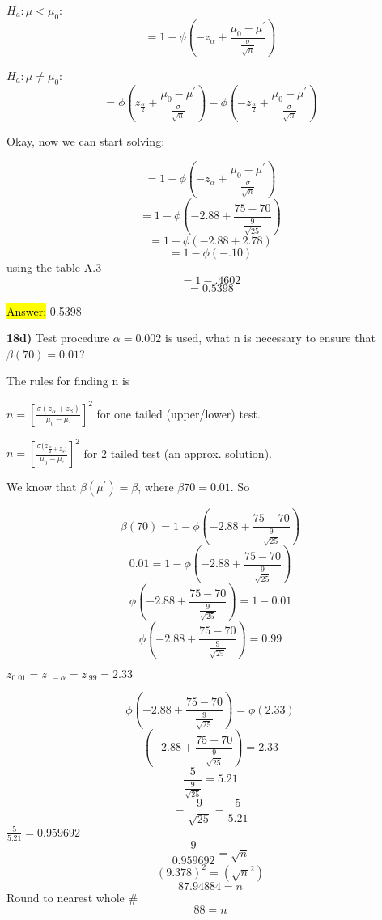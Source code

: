 \documentclass{article}
\begin{document}
$H_{a}: \mu < \mu_{0}$:
\vspace{2mm}
$$=1-\phi(-z_{\alpha}+\frac{\mu_{0}-\mu^{'}}{\frac{\sigma}{\sqrt{n}}})$$

$H_{a}: \mu \ne \mu_{0}$:
\vspace{2mm}
$$=\phi(z_{\frac{\alpha}{2}}+\frac{\mu_{0}-\mu^{'}}{\frac{\sigma}{\sqrt{n}}})-\phi(-z_{\frac{\alpha}{2}}+\frac{\mu_{0}-\mu^{'}}{\frac{\sigma}{\sqrt{n}}})$$

Okay, now we can start solving:

$$=1-\phi(-z_{\alpha}+\frac{\mu_{0}-\mu^{'}}{\frac{\sigma}{\sqrt{n}}})$$
$$=1-\phi(-2.88+\frac{75-70}{\frac{9}{\sqrt{25}}})$$
$$=1-\phi(-2.88+2.78)$$
$$=1-\phi(-.10)$$
using the table A.3
$$=1-.4602$$
$$=0.5398$$

\vspace{2mm}

\hl{Answer:} 0.5398

\vspace{5mm}
\textbf{18d)} Test procedure $\alpha=0.002$ is used, what n is necessary to ensure that $\beta(70)=0.01$?

\vspace{2mm}

The rules for finding n is 

\vspace{2mm}

$n=[\frac{\sigma(z_{\alpha}+z_{\beta})}{\mu_{0}-\mu_{'}}]^{2}$ for one tailed (upper/lower) test.

\vspace{2mm}

$n=[\frac{\sigma(z_{\frac{\alpha}{2}+z_{\beta})}}{\mu_{0}-\mu_{'}}]^{2}$ for 2 tailed test (an approx. solution).

\vspace{2mm}

We know that $\beta(\mu^{'})=\beta$, where $\beta{70}=0.01$. So

\vspace{2mm}

$$\beta(70)=1-\phi(-2.88+\frac{75-70}{\frac{9}{\sqrt{25}}})$$
$$0.01=1-\phi(-2.88+\frac{75-70}{\frac{9}{\sqrt{25}}})$$
$$\phi(-2.88+\frac{75-70}{\frac{9}{\sqrt{25}}})=1-0.01$$
$$\phi(-2.88+\frac{75-70}{\frac{9}{\sqrt{25}}})=0.99$$

$z_{0.01}=z_{1-\alpha}=z_{.99}=2.33$

$$\phi(-2.88+\frac{75-70}{\frac{9}{\sqrt{25}}})=\phi(2.33)$$
$$(-2.88+\frac{75-70}{\frac{9}{\sqrt{25}}})=2.33$$
$$\frac{5}{\frac{9}{\sqrt{25}}}=5.21$$
$$=\frac{9}{\sqrt{25}}=\frac{5}{5.21}$$
$\frac{5}{5.21}=0.959692$
$$\frac{9}{0.959692}=\sqrt{n}$$
$$(9.378)^{2}=(\sqrt{n}^{2})$$
$$87.94884=n$$
Round to nearest whole \#
$$88=n$$
\end{document}
